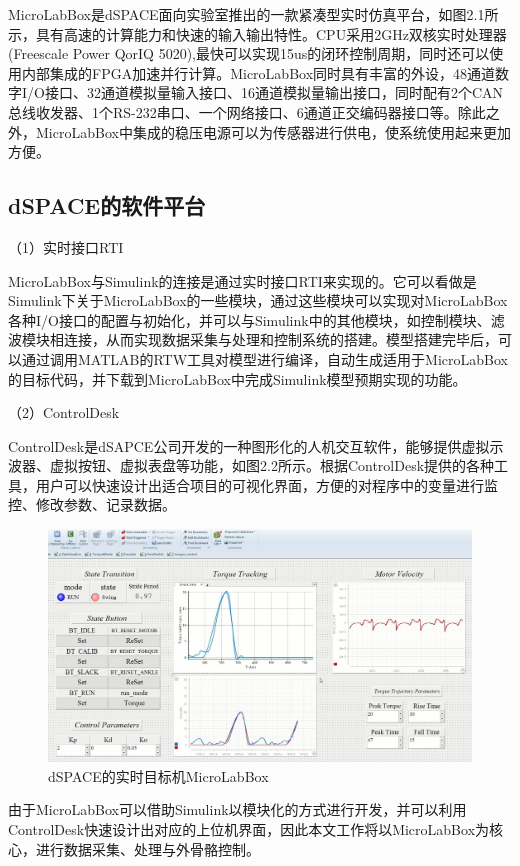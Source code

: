 MicroLabBox是dSPACE面向实验室推出的一款紧凑型实时仿真平台，如图2.1所示，具有高速的计算能力和快速的输入输出特性。CPU采用2GHz双核实时处理器(Freescale Power QorIQ 5020),最快可以实现15us的闭环控制周期，同时还可以使用内部集成的FPGA加速并行计算。MicroLabBox同时具有丰富的外设，48通道数字I/O接口、32通道模拟量输入接口、16通道模拟量输出接口，同时配有2个CAN总线收发器、1个RS-232串口、一个网络接口、6通道正交编码器接口等。除此之外，MicroLabBox中集成的稳压电源可以为传感器进行供电，使系统使用起来更加方便。

\subsection{dSPACE的软件平台}
（1）实时接口RTI

MicroLabBox与Simulink的连接是通过实时接口RTI来实现的。它可以看做是Simulink下关于MicroLabBox的一些模块，通过这些模块可以实现对MicroLabBox各种I/O接口的配置与初始化，并可以与Simulink中的其他模块，如控制模块、滤波模块相连接，从而实现数据采集与处理和控制系统的搭建。模型搭建完毕后，可以通过调用MATLAB的RTW工具对模型进行编译，自动生成适用于MicroLabBox的目标代码，并下载到MicroLabBox中完成Simulink模型预期实现的功能。
    
（2）ControlDesk

ControlDesk是dSAPCE公司开发的一种图形化的人机交互软件，能够提供虚拟示波器、虚拟按钮、虚拟表盘等功能，如图2.2所示。根据ControlDesk提供的各种工具，用户可以快速设计出适合项目的可视化界面，方便的对程序中的变量进行监控、修改参数、记录数据。

\begin{figure}[htb]
    \includegraphics[width=14cm]{fig/f22.jpg}
    \caption{dSPACE的实时目标机MicroLabBox}
    \label{fig:mark}
\end{figure}

由于MicroLabBox可以借助Simulink以模块化的方式进行开发，并可以利用ControlDesk快速设计出对应的上位机界面，因此本文工作将以MicroLabBox为核心，进行数据采集、处理与外骨骼控制。

